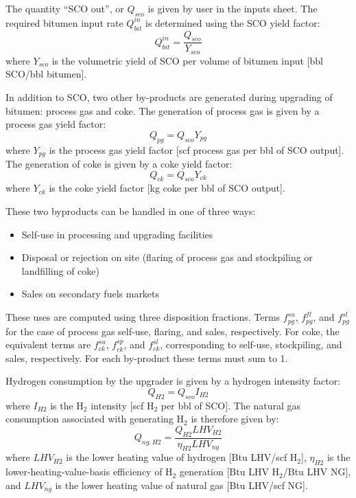 \documentclass[11pt]{report}
\begin{document}
The quantity ``SCO out'', or $Q_{sco}$ is given by user in the inputs sheet.  The required bitumen input rate $Q_{bit}^{in}$ is determined using the SCO yield factor:
\begin{equation}
Q_{bit}^{in} = \frac{Q_{sco}}{Y_{sco}}
\end{equation}
where $Y_{sco}$ is the volumetric yield of SCO per volume of bitumen input [bbl SCO/bbl bitumen].

In addition to SCO, two other by-products are generated during upgrading of bitumen: process gas and coke.  The generation of process gas is given by a process gas yield factor:
\begin{equation}
Q_{pg} = Q_{sco}Y_{pg}
\end{equation}
where $Y_{pg}$ is the process gas yield factor [scf process gas per bbl of SCO output]. The generation of coke is given by a coke yield factor:
\begin{equation}
Q_{ck} = Q_{sco}Y_{ck}
\end{equation}
where $Y_{ck}$ is the coke yield factor [kg coke per bbl of SCO output]. 

These two byproducts can be handled in one of three ways:
\begin{itemize}
\item Self-use in processing and upgrading facilities
\item Disposal or rejection on site (flaring of process gas and stockpiling or landfilling of coke)
\item Sales on secondary fuels markets
\end{itemize}

These uses are computed using three disposition fractions. Terms $f_{pg}^{su}$, $f_{pg}^{fl}$, and $f_{pg}^{sl}$ for the case of process gas self-use, flaring, and sales, respectively. For coke, the equivalent terms are $f_{ck}^{su}$, $f_{ck}^{sp}$, and $f_{ck}^{sl}$, corresponding to self-use, stockpiling, and sales, respectively. For each by-product these terms must sum to 1.  

Hydrogen consumption by the upgrader is given by a hydrogen intensity factor:
\begin{equation}
Q_{H2} = Q_{sco}I_{H2}
\end{equation}
where $I_{H2}$ is the H$_2$ intensity [scf H$_2$ per bbl of SCO].  The natural gas consumption associated with generating H$_2$ is therefore given by:
\begin{equation}
Q_{ng,H2} = \frac{Q_{H2} LHV_{H2}}{\eta_{H2} LHV_{ng}}
\end{equation}
where $LHV_{H2}$ is the lower heating value of hydrogen [Btu LHV/scf H$_2$], $\eta_{H2}$ is the lower-heating-value-basis efficiency of H$_2$ generation [Btu LHV H$_2$/Btu LHV NG], and $LHV_{ng}$ is the lower heating value of natural gas [Btu LHV/scf NG].
\end{document}
